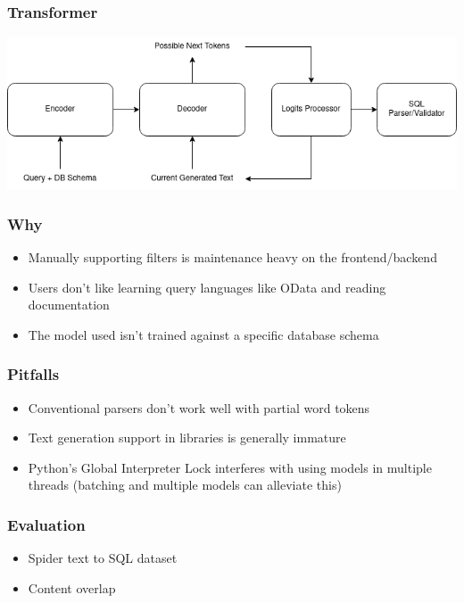 \documentclass{beamer}
\begin{document}
\begin{frame}
\frametitle{Transformer}

\includegraphics[scale=0.45]{t5-transformer.drawio.png}

\end{frame}

\begin{frame}
\frametitle{Why}

\begin{itemize}[<+->]
  \item Manually supporting filters is maintenance heavy on the frontend/backend
  \item Users don't like learning query languages like OData and reading documentation
  \item The model used isn't trained against a specific database schema
\end{itemize}

\end{frame}

\begin{frame}
\frametitle{Pitfalls}

\begin{itemize}[<+->]
  \item Conventional parsers don't work well with partial word tokens
  \item Text generation support in libraries is generally immature
  \item Python's Global Interpreter Lock interferes with using models in multiple threads (batching and multiple models can alleviate this)
\end{itemize}

\end{frame}

\begin{frame}
\frametitle{Evaluation}

\begin{itemize}[<+->]
  \item Spider text to SQL dataset
  \item Content overlap
\end{itemize}

\end{frame}
\end{document}
